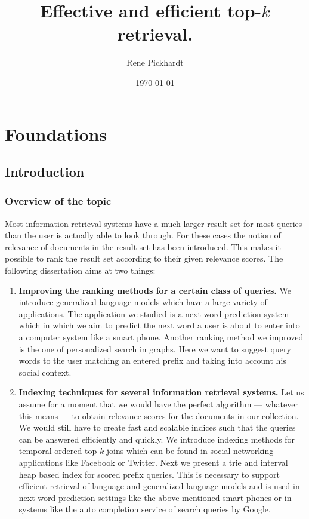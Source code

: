 \documentclass[•]{book}
\title{Effective and efficient top-$k$ retrieval.}
\author{Rene Pickhardt}
\date{\today}
\begin{document}
\maketitle
\tableofcontents

\part{Foundations}
\chapter{Introduction}
\section{Overview of the topic}
Most information retrieval systems \cite{} have a much larger result set for most queries than the user is actually able to look through.
For these cases the notion of relevance of documents in the result set has been introduced. 
This makes it possible to rank the result set according to their given relevance scores.
The following dissertation aims at two things: 

\begin{enumerate}
\item \textbf{Improving the ranking methods for a certain class of queries.}
We introduce generalized language models which have a large variety of applications\cite{own:typology:2013}. 
The application we studied is a next word prediction system which in which we aim to predict the next word a user is about to enter into a computer system like a smart phone. 
Another ranking method we improved is the one of personalized search in graphs\cite{own:graphSearch:2013}.
Here we want to suggest query words to the user matching an entered prefix and taking into account his social context.

\item \textbf{Indexing techniques for several information retrieval systems.}
Let us assume for a moment that we would have the perfect algorithm --- whatever this means --- to obtain relevance scores for the documents in our collection.
We would still have to create fast and scalable indices such that the queries can be answered efficiently and quickly.
We introduce indexing methods for temporal ordered top $k$ joins \cite{own:graphity:2012} which can be found in social networking applications like Facebook or Twitter.
Next we present a trie and interval heap based index for scored prefix queries\cite{own:prefix:2013}. 
This is necessary to support efficient retrieval of language and generalized language models and is used in next word prediction settings like the above mentioned smart phones or in systems like the auto completion service of search queries by Google.
\end{enumerate}
\end{document}
